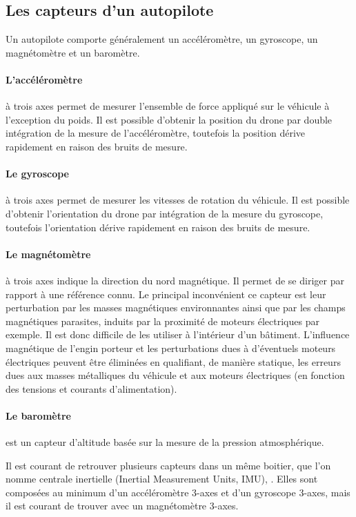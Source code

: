  \subsection{Les capteurs d'un autopilote}
 Un autopilote comporte généralement un accéléromètre, un gyroscope, un magnétomètre et un baromètre.
 
 \paragraph{L'accéléromètre}à trois axes permet de mesurer l'ensemble de force appliqué sur le véhicule à l'exception du poids. Il est possible d'obtenir la position du drone par double intégration de la mesure de l'accéléromètre, toutefois la position dérive rapidement en raison des bruits de mesure.

 \paragraph{Le gyroscope}à trois axes permet de mesurer les vitesses de rotation du véhicule. Il est possible d'obtenir l'orientation du drone par intégration de la mesure du gyroscope, toutefois l'orientation dérive rapidement en raison des bruits de mesure.

 \paragraph{Le magnétomètre} à trois axes indique la direction du nord magnétique. Il permet de se diriger par rapport à une référence connu. Le principal inconvénient ce capteur est leur perturbation par les masses magnétiques environnantes ainsi que par les champs magnétiques parasites, induits par la proximité de moteurs électriques par exemple. Il est donc difficile de les utiliser à l'intérieur d'un bâtiment. L'influence magnétique de l'engin porteur et les perturbations dues à d'éventuels moteurs électriques peuvent être éliminées en qualifiant, de manière statique, les erreurs dues aux masses métalliques du véhicule et aux moteurs électriques (en fonction des tensions et courants d'alimentation).

 \paragraph{Le baromètre}est un capteur d'altitude basée sur la mesure de la pression atmosphérique.

 Il est courant de retrouver plusieurs capteurs dans un même boitier, que l'on nomme centrale inertielle (Inertial Measurement Units, IMU), . Elles sont composées au minimum d'un accéléromètre 3-axes et d'un gyroscope 3-axes, mais il est courant de trouver avec un magnétomètre 3-axes. 


